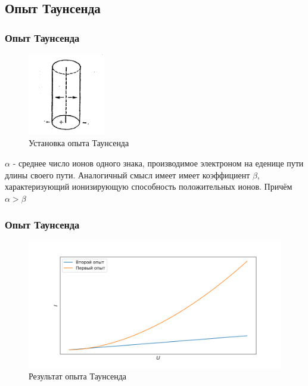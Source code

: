 \documentclass{beamer}
\begin{document}


\begin{frame}
\subsection{Опыт Таунсенда}
\frametitle{Опыт Таунсенда}

\begin{figure}
	\vspace{-35pt}
	\centering
	\includegraphics[width=0.3\textwidth]{ pics/setup.png}
	\caption{Установка опыта Таунсенда}
\end{figure}

$\alpha$ - среднее число ионов одного знака, производимое электроном на еденице пути длины
своего пути. Аналогичный смысл имеет имеет коэффициент $\beta $, характеризующий ионизирующую
способность положительных ионов. Причём  $\alpha > \beta$

\end{frame}


\begin{frame}
\frametitle{Опыт Таунсенда}

\begin{figure}[H]
        \centering
        \includegraphics[scale=0.45]{./pics/taus.png}
        \caption{Результат опыта Таунсенда}
\end{figure}

\end{frame}
\end{document}
